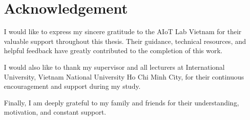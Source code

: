 \chapter*{Acknowledgement}

I would like to express my sincere gratitude to the AIoT Lab Vietnam for their valuable support throughout this thesis. Their guidance, technical resources, and helpful feedback have greatly contributed to the completion of this work.

I would also like to thank my supervisor and all lecturers at International University, Vietnam National University Ho Chi Minh City, for their continuous encouragement and support during my study.

Finally, I am deeply grateful to my family and friends for their understanding, motivation, and constant support.
